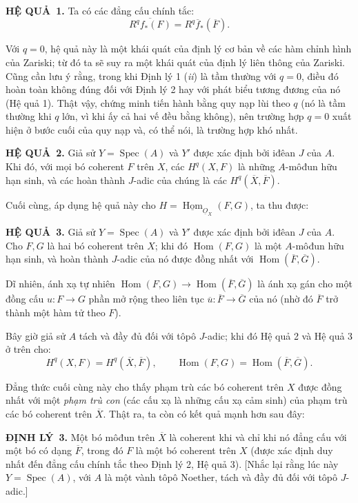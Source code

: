 \documentclass[11pt,twoside,openany]{book}
\numberwithin{equation}{section}
\newcommand{\src}[1]{%
  \phantomsection\hypertarget{src:\fgasourceid:#1}{}%
  \marginpar{\raggedleft\footnotesize\sffamily #1}%
}
\newcommand{\fgasourceid}{unset}
\newcommand{\Osh}{\underline{O}}
\newcommand{\Homsh}{\underline{\operatorname{Hom}}}
\newcommand{\fquote}[1]{\textquotedbl#1\textquotedbl}
\newcommand{\result}[2]{\par\medskip\noindent\textbf{#1\if\relax\detokenize{#2}\relax\else\ #2\fi.}\quad}
\begin{document}
\result{HỆ QUẢ}{1} Ta có các đẳng cấu chính tắc:
\[
  \overline{R^{q}f_{*}(F)}=R^{q}\overline f_{*}(\overline F).
\]

Với $q=0$, hệ quả này là một khái quát của \fquote{định lý cơ bản về các hàm
chỉnh hình} của Zariski; từ đó ta sẽ suy ra một khái quát của
\fquote{định lý liên thông} của Zariski. Cũng cần lưu ý rằng, trong khi Định
lý 1 (\textit{ii}) là tầm thường với $q=0$, điều đó hoàn toàn không đúng đối
với Định lý 2 hay với phát biểu tương đương của nó (Hệ quả 1). Thật vậy, chứng
minh tiến hành bằng quy nạp lùi theo $q$ (nó là tầm thường khi $q$ lớn, vì khi
ấy cả hai vế đều bằng không), nên trường hợp $q=0$ xuất hiện ở bước cuối của
quy nạp và, có thể nói, là trường hợp \fquote{khó nhất}.

\result{HỆ QUẢ}{2} Giả sử $Y=\operatorname{Spec}(A)$ và $Y'$ được xác định bởi
iđêan $J$ của $A$. Khi đó, với mọi bó coherent $F$ trên $X$, các
$H^{q}(X,F)$ là những $A$-môđun hữu hạn sinh, và các hoàn thành $J$-adic của
chúng là các $H^{q}(\overline X,\overline F)$.

Cuối cùng, áp dụng hệ quả này cho $H=\Homsh_{\Osh_X}(F,G)$, ta thu được:

\result{HỆ QUẢ}{3} Giả sử $Y=\operatorname{Spec}(A)$ và $Y'$ được xác định bởi
iđêan $J$ của $A$. Cho $F,G$ là hai bó coherent trên $X$; khi đó
$\operatorname{Hom}(F,G)$ là một $A$-môđun hữu hạn sinh, và hoàn thành
$J$-adic của nó được đồng nhất với
$\operatorname{Hom}(\overline F,\overline G)$.

Dĩ nhiên, ánh xạ tự nhiên
$\operatorname{Hom}(F,G)\longrightarrow
\operatorname{Hom}(\overline F,\overline G)$ là ánh xạ gán cho một đồng cấu
$u:F\longrightarrow G$ phần mở rộng \fquote{theo liên tục}
$\overline u:\overline F\longrightarrow\overline G$ của nó (nhờ đó
$\overline F$ trở thành một hàm tử theo $F$).

Bây giờ giả sử $A$ tách và đầy đủ đối với tôpô $J$-adic; khi đó Hệ quả 2 và
Hệ quả 3 ở trên cho:
\[
  H^{q}(X,F)=H^{q}(\overline X,\overline F),
  \qquad
  \operatorname{Hom}(F,G)
  =\operatorname{Hom}(\overline F,\overline G).
\]

\src{198}
Đẳng thức cuối cùng này cho thấy phạm trù các bó coherent trên $X$ được đồng
nhất với một \emph{phạm trù con} (các cấu xạ là những cấu xạ cảm sinh) của
phạm trù các bó coherent trên $\overline X$. Thật ra, ta còn có kết quả mạnh
hơn sau đây:

\result{ĐỊNH LÝ}{3} Một bó môđun trên $\overline X$ là coherent khi và chỉ khi
nó đẳng cấu với một bó có dạng $\overline F$, trong đó $F$ là một bó coherent
trên $X$ (được xác định duy nhất đến đẳng cấu chính tắc theo Định lý 2, Hệ quả
3). [Nhắc lại rằng lúc này $Y=\operatorname{Spec}(A)$, với $A$ là một vành
tôpô Noether, tách và đầy đủ đối với tôpô $J$-adic.]
\end{document}
